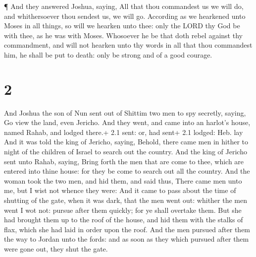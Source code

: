  ¶ And they answered Joshua, saying, All that thou
commandest us we will do, and whithersoever thou sendest us, we will go.
 According as we hearkened unto Moses in all things, so
will we hearken unto thee: only the LORD thy God be with thee, as he was
with Moses.  Whosoever he be that doth rebel against thy
commandment, and will not hearken unto thy words in all that thou
commandest him, he shall be put to death: only be strong and of a good
courage.

\hypertarget{section-1}{%
\section{2}\label{section-1}}

 And Joshua the son of Nun sent out of Shittim two men to
spy secretly, saying, Go view the land, even Jericho. And they went, and
came into an harlot's house, named Rahab, and lodged there.+ 2.1 sent:
or, had sent+ 2.1 lodged: Heb. lay  And it was told the king
of Jericho, saying, Behold, there came men in hither to night of the
children of Israel to search out the country.  And the king
of Jericho sent unto Rahab, saying, Bring forth the men that are come to
thee, which are entered into thine house: for they be come to search out
all the country.  And the woman took the two men, and hid
them, and said thus, There came men unto me, but I wist not whence they
were:  And it came to pass about the time of shutting of the
gate, when it was dark, that the men went out: whither the men went I
wot not: pursue after them quickly; for ye shall overtake them.
 But she had brought them up to the roof of the house, and
hid them with the stalks of flax, which she had laid in order upon the
roof.  And the men pursued after them the way to Jordan unto
the fords: and as soon as they which pursued after them were gone out,
they shut the gate.

